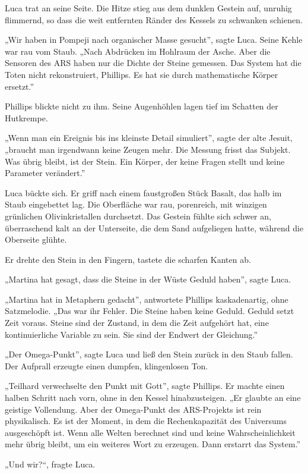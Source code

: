\documentclass[
  ngerman,
]{article}
\begin{document}
Luca trat an seine Seite. Die Hitze stieg aus dem dunklen Gestein auf,
unruhig flimmernd, so dass die weit entfernten Ränder des Kessels zu
schwanken schienen.

„Wir haben in Pompeji nach organischer Masse gesucht'', sagte Luca.
Seine Kehle war rau vom Staub. „Nach Abdrücken im Hohlraum der Asche.
Aber die Sensoren des ARS haben nur die Dichte der Steine gemessen. Das
System hat die Toten nicht rekonstruiert, Phillips. Es hat sie durch
mathematische Körper ersetzt.''

Phillips blickte nicht zu ihm. Seine Augenhöhlen lagen tief im Schatten
der Hutkrempe.

„Wenn man ein Ereignis bis ins kleinste Detail simuliert'', sagte der
alte Jesuit, „braucht man irgendwann keine Zeugen mehr. Die Messung
frisst das Subjekt. Was übrig bleibt, ist der Stein. Ein Körper, der
keine Fragen stellt und keine Parameter verändert.''

Luca bückte sich. Er griff nach einem faustgroßen Stück Basalt, das halb
im Staub eingebettet lag. Die Oberfläche war rau, porenreich, mit
winzigen grünlichen Olivinkristallen durchsetzt. Das Gestein fühlte sich
schwer an, überraschend kalt an der Unterseite, die dem Sand aufgeliegen
hatte, während die Oberseite glühte.

Er drehte den Stein in den Fingern, tastete die scharfen Kanten ab.

„Martina hat gesagt, dass die Steine in der Wüste Geduld haben'', sagte
Luca.

„Martina hat in Metaphern gedacht'', antwortete Phillips kaskadenartig,
ohne Satzmelodie. „Das war ihr Fehler. Die Steine haben keine Geduld.
Geduld setzt Zeit voraus. Steine sind der Zustand, in dem die Zeit
aufgehört hat, eine kontinuierliche Variable zu sein. Sie sind der
Endwert der Gleichung.''

„Der Omega-Punkt'', sagte Luca und ließ den Stein zurück in den Staub
fallen. Der Aufprall erzeugte einen dumpfen, klingenlosen Ton.

„Teilhard verwechselte den Punkt mit Gott'', sagte Phillips. Er machte
einen halben Schritt nach vorn, ohne in den Kessel hinabzusteigen. „Er
glaubte an eine geistige Vollendung. Aber der Omega-Punkt des
ARS-Projekts ist rein physikalisch. Es ist der Moment, in dem die
Rechenkapazität des Universums ausgeschöpft ist. Wenn alle Welten
berechnet sind und keine Wahrscheinlichkeit mehr übrig bleibt, um ein
weiteres Wort zu erzeugen. Dann erstarrt das System.''

„Und wir?{\kern0pt}``, fragte Luca.
\end{document}
